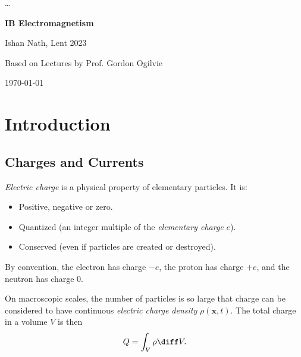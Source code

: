 \documentclass[12pt]{article}
\begin{document}
\robustify\dots
{}


\hypersetup{pageanchor=false}
\begin{titlepage}
	\begin{center}
		\vspace*{1em}
		\Huge
		\textbf{IB Electromagnetism}

		\vspace{1em}
		\large
		Ishan Nath, Lent 2023

		\vspace{1.5em}

		\Large

		Based on Lectures by Prof. Gordon Ogilvie

		\vspace{1em}

		\large
		\today
	\end{center}
	
\end{titlepage}
\hypersetup{pageanchor=true}

\tableofcontents

\newpage

\section{Introduction}
\label{sec:introduction}

\subsection{Charges and Currents}
\label{sub:charges_and_currents}

\emph{Electric charge} is a physical property of elementary particles. It is:
\begin{itemize}
	\item Positive, negative or zero.
	\item Quantized (an integer multiple of the \emph{elementary charge} $e$).
	\item Conserved (even if particles are created or destroyed).
\end{itemize}

By convention, the electron has charge $-e$, the proton has charge $+e$, and the neutron has charge $0$.

On macroscopic scales, the number of particles is so large that charge can be considered to have continuous \emph{electric charge density} $\rho(\mathbf{x},t)$. The total charge in a volume $V$ is then
\[
Q = \int_{V} \rho \diff V
.\]
\end{document}
